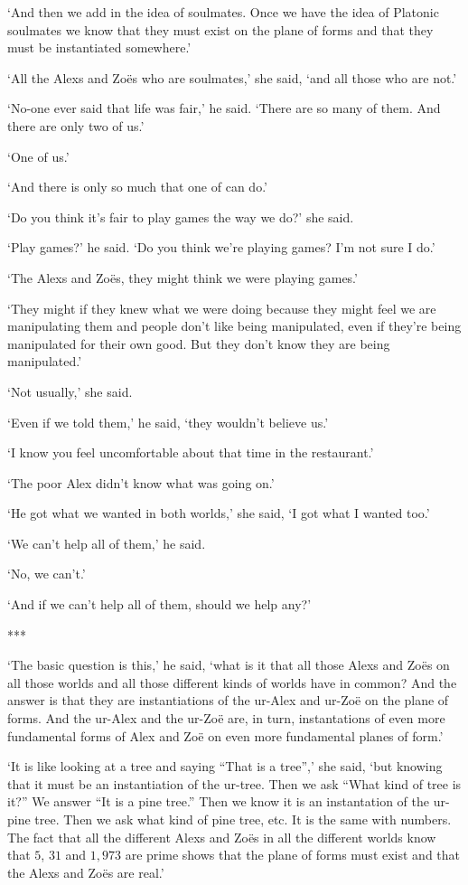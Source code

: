 `And then we add in the idea of soulmates. Once we have the {\twelveit idea\/} of Platonic soulmates we know that they must exist on the plane of forms and that they must be instantiated somewhere.'

`All the Alexs and Zoës who are soulmates,' she said, `and all those who are not.'

`No-one ever said that life was fair,' he said. `There are so many of them. And there are only two of us.'

`One of us.'

`And there is only so much that one of can do.'

`Do you think it's fair to play games the way we do?' she said.

`Play games?' he said. `Do you think we're playing games? I'm
not sure I do.'

`The Alexs and Zoës, they might think we were playing games.'

`They might if they knew what we were doing because they might feel we are manipulating them and people don't like being manipulated, even if they're being manipulated for their own good. But they don't know they are being manipulated.'

`Not usually,' she said.

`Even if we told them,' he said, `they wouldn't
believe us.'

`I know you feel uncomfortable about that time in the restaurant.'

`The poor Alex didn't know what was going on.'

`He got what we wanted in both worlds,' she said, `I got what I wanted too.'

`We can't help all of them,' he said.

`No, we can't.'

`And if we can't help all of them, should we help any?'

***

`The basic question is this,' he said, `what is it that all those Alexs and Zoës on all those worlds and all those different kinds of worlds have in common? And the answer is that they are instantiations of the ur-Alex and ur-Zoë on the plane of forms. And the ur-Alex and the ur-Zoë are, in turn, instantations of even more fundamental forms of Alex and Zoë on even more fundamental planes of form.'

`It is like looking at a tree and saying ``That is a tree'',' she said, `but knowing that it must be an instantiation of the ur-tree. Then we ask ``What kind of tree is it?'' We answer ``It is a pine tree.'' Then we know it is an instantation of the ur-pine tree. Then we ask what kind of pine tree, etc. It is the same with numbers. The fact that all the different Alexs and Zoës in all the different worlds {\twelveit know\/} that $5$, $31$ and $1,973$ are prime shows that the plane of forms must exist and that the Alexs and Zoës are real.'

